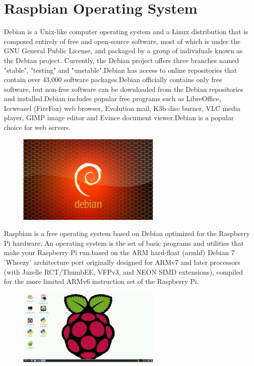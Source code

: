\documentclass[11pt,a4paper]{article}
\begin{document}
	\section{Raspbian Operating System}
	Debian is a Unix-like computer operating system and a Linux distribution that is composed entirely of free and open-source software, most of which is under the GNU General Public License, and packaged by a group of individuals known as the Debian project. Currently, the Debian project offers three branches named "stable", "testing" and "unstable".Debian has access to online repositories that contain over 43,000 software packages.Debian officially contains only free software, but non-free software can be downloaded from the Debian repositories and installed.Debian includes popular free programs such as LibreOffice, Iceweasel (FireFox) web browser, Evolution mail, K3b disc burner, VLC media player, GIMP image editor and Evince document viewer.Debian is a popular choice for web servers.
		\begin{figure}[h!]
			\includegraphics[width=7cm]{d.jpg}
			\centering
		\end{figure} 
		
	Raspbian is a free operating system based on Debian optimized for the Raspberry Pi hardware. An operating system is the set of basic programs and utilities that make your Raspberry Pi run.based on the ARM hard-float (armhf) Debian 7 'Wheezy' architecture port originally designed for ARMv7 and later processors (with Jazelle RCT/ThumbEE, VFPv3, and NEON SIMD extensions), compiled for the more limited ARMv6 instruction set of the Raspberry Pi.
	\begin{figure}[h!]
		\includegraphics[width=7cm]{Raspbian.jpg}
		\centering
	\end{figure} 
	 
\end{document}
